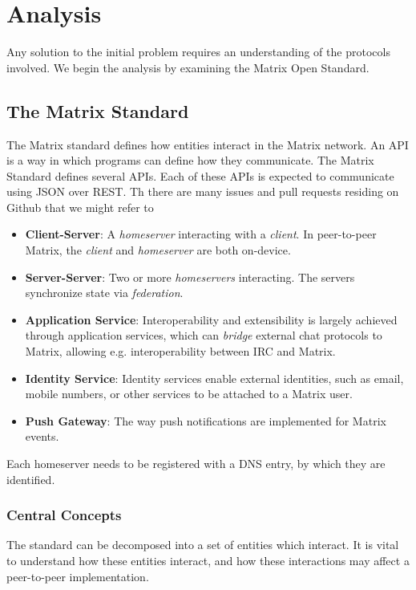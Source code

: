 \chapter{Analysis}
Any solution to the initial problem requires an understanding of the protocols involved.
We begin the analysis by examining the Matrix Open Standard.

\section{The Matrix Standard}
The Matrix standard defines how entities interact in the Matrix network.
An \ac{API} is a way in which programs can define how they communicate.
The Matrix Standard defines several \ac{API}s.
Each of these \ac{API}s is expected to communicate using \ac{JSON} over \ac{REST}.
Th there are many issues and pull requests residing on Github that we might refer to
\begin{itemize}
    \item \textbf{Client-Server}: A \textit{homeserver} interacting with a \textit{client}. In peer-to-peer Matrix, the \textit{client} and \textit{homeserver} are both on-device.
    \item \textbf{Server-Server}: Two or more \textit{homeservers} interacting. The servers synchronize state via \textit{federation}.
    \item \textbf{Application Service}: Interoperability and extensibility is largely achieved through application services, which can \textit{bridge} external chat protocols to Matrix, allowing e.g. interoperability between \ac{IRC} and Matrix.
    \item \textbf{Identity Service}: Identity services enable external identities, such as email, mobile numbers, or other services to be attached to a Matrix user.
    \item \textbf{Push Gateway}: The way push notifications are implemented for Matrix events.
\end{itemize}

Each homeserver needs to be registered with a \ac{DNS} entry, by which they are identified.

\subsection{Central Concepts}
The standard can be decomposed into a set of entities which interact.
It is vital to understand how these entities interact, and how these interactions may affect a peer-to-peer implementation.

